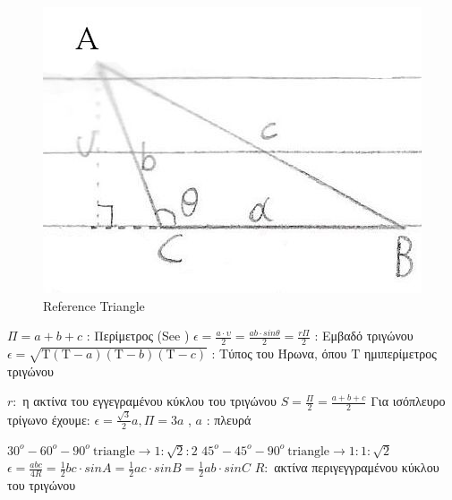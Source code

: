 \documentclass[12pt]{article}
\newcommand{\Tau}{\mathrm{T}} %
\begin{document}
\begin{flushleft}
	\begin{figure}[H] 
	\centering
	\includegraphics[scale=2]{trigono}
	\caption{Reference Triangle}
	\label{fig:trigono} %
	\end{figure}
	
	\textbullet \quad $ \Pi = a + b + c $  :  \textgreek{Περίμετρος} (See ) \linebreak 
	\textbullet \quad $\displaystyle \epsilon = \frac{a \cdot \upsilon}{2} = \frac{ab\cdot sin \theta}{2} = \frac{r\Pi}{2} $  :  \textgreek{Εμβαδό τριγώνου} \linebreak 
	\textbullet \quad $\displaystyle \epsilon = \sqrt{\Tau (\Tau -a)(\Tau -b)(\Tau -c)} $  :  \textgreek{Τύπος του Ήρωνα, όπου} $\Tau$ \textgreek{ημιπερίμετρος τριγώνου} \linebreak 
	
	$r:$ \textgreek{η ακτίνα του εγγεγραμένου κύκλου του τριγώνου} \linebreak
	\textbullet \quad $\displaystyle S = \frac{\Pi}{2} = \frac{a + b + c}{2} $ \linebreak
	\textbullet \quad \textgreek{Για ισόπλευρο τρίγωνο έχουμε:} $\displaystyle \epsilon = \frac{\sqrt{3}}{2}a, \Pi = 3a$ , $a$  :  \textgreek{πλευρά} \linebreak

	\textbullet \quad $\displaystyle 30^o-60^o-90^o \ \text{triangle} \rightarrow 1:\sqrt{2}:2 $ \linebreak 
	\textbullet \quad $\displaystyle 45^o-45^o-90^o \ \text{triangle} \rightarrow 1:1:\sqrt{2} $ \linebreak 
	\textbullet \quad $\displaystyle \epsilon = \frac{abc}{4R} = \frac{1}{2}bc\cdot sinA = \frac{1}{2}ac\cdot sinB = \frac{1}{2}ab\cdot sinC $ $R: $ \textgreek{ακτίνα περιγεγγραμένου κύκλου του τριγώνου} \linebreak
	

\end{flushleft}
\end{document}
